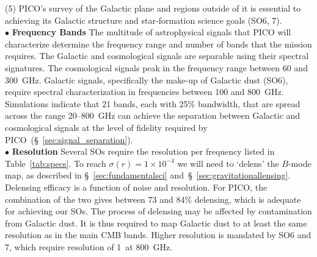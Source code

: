 \documentclass[PICOReport.tex]{subfiles}
\begin{document}
(5) PICO's survey of the Galactic plane and regions outside of it is essential to achieving its Galactic structure  and star-formation science goals (SO6, 7). \\
%
$\bullet$ {\bf Frequency Bands} \hspace{0.1in} The multitude of astrophysical signals that PICO will characterize determine the frequency range and number of bands that the mission requires. The Galactic and cosmological signals are separable using their spectral signatures. The cosmological signals peak in the frequency range between 60 and 300~GHz. Galactic signals, specifically the make-up of Galactic dust (SO6), require spectral characterization in frequencies between 100 and 800~GHz. Simulations indicate that 21 bands, each with 25\% bandwidth, that are spread across the range 20--800~GHz can achieve the separation between Galactic and cosmological signals at the level of fidelity required by PICO~(\S~\ref{sec:signal_separation}). \\
%
$\bullet$ {\bf Resolution} \hspace{0.1in} 
Several \ac{SOs} require the resolution per frequency listed in Table~\ref{tab:specs}. To reach $\sigma(r) = 1\times10^{-4}$ we will need to `delens' the $B$-mode map, as described in \S~\ref{sec:fundamentalsci} and~\S~\ref{sec:gravitationallensing}. Delensing efficacy is a function of noise and resolution. For PICO, the combination of the two gives between 73 and 84\% delensing, which is adequate for achieving our \ac{SOs}. The process of delensing may be affected by contamination from Galactic dust. It is thus required to map Galactic dust to at least the same resolution as in the main CMB bands.  Higher resolution is mandated by SO6 and 7, which require resolution of 1\arcmin\ at 800~GHz. 
\end{document}
